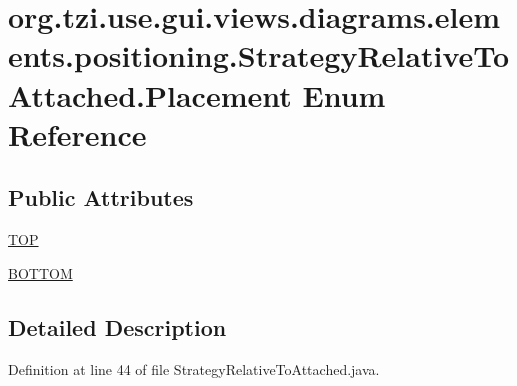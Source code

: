 \hypertarget{enumorg_1_1tzi_1_1use_1_1gui_1_1views_1_1diagrams_1_1elements_1_1positioning_1_1_strategy_relative_to_attached_1_1_placement}{\section{org.\-tzi.\-use.\-gui.\-views.\-diagrams.\-elements.\-positioning.\-Strategy\-Relative\-To\-Attached.\-Placement Enum Reference}
\label{enumorg_1_1tzi_1_1use_1_1gui_1_1views_1_1diagrams_1_1elements_1_1positioning_1_1_strategy_relative_to_attached_1_1_placement}
}
\subsection*{Public Attributes}
\begin{DoxyCompactItemize}
\item 
\hyperlink{enumorg_1_1tzi_1_1use_1_1gui_1_1views_1_1diagrams_1_1elements_1_1positioning_1_1_strategy_relative_to_attached_1_1_placement_a8bf659c4e653d3cfb842b97fcbe9f66b}{T\-O\-P}
\item 
\hyperlink{enumorg_1_1tzi_1_1use_1_1gui_1_1views_1_1diagrams_1_1elements_1_1positioning_1_1_strategy_relative_to_attached_1_1_placement_a72a4f16c41a68bea4d537af8487d0ad7}{B\-O\-T\-T\-O\-M}
\end{DoxyCompactItemize}


\subsection{Detailed Description}


Definition at line 44 of file Strategy\-Relative\-To\-Attached.\-java.



